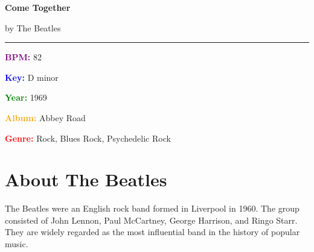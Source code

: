 \documentclass[11pt,letterpaper]{article}
\newcommand{\purple}[1]{\textcolor{purple}{\textbf{#1}}}
\newcommand{\bluepurple}[1]{\textcolor{blue}{\textbf{#1}}}
\newcommand{\greentext}[1]{\textcolor{green}{\textbf{#1}}}
\newcommand{\redtext}[1]{\textcolor{red}{\textbf{#1}}}
\newcommand{\orangetext}[1]{\textcolor{orange}{\textbf{#1}}}
\begin{document}
\thispagestyle{empty}

\begin{center}
{\Huge\bfseries\sffamily Come Together}

\vspace{0.3cm}

{\LARGE by The Beatles}

\vspace{0.5cm}


\vspace{0.5cm}

\rule{0.8\textwidth}{0.5pt}
\end{center}

\vspace{0.5cm}

\begin{tcolorbox}[colback=lightgray,colframe=purple,width=\textwidth,arc=3mm,boxrule=1pt]
\begin{multicols}{2}
\textbf{\purple{BPM:}} 82

\textbf{\bluepurple{Key:}} D minor

\textbf{\greentext{Year:}} 1969

\textbf{\orangetext{Album:}} Abbey Road

\textbf{\redtext{Genre:}} Rock, Blues Rock, Psychedelic Rock
\end{multicols}
\end{tcolorbox}

\vspace{0.5cm}

\section*{About The Beatles}

The Beatles were an English rock band formed in Liverpool in 1960. The group consisted of John Lennon, Paul McCartney, George Harrison, and Ringo Starr. They are widely regarded as the most influential band in the history of popular music.
\end{document}
